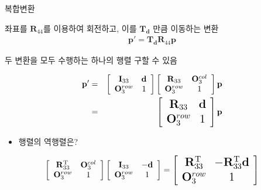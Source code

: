 \begin{frame}{복합변환}


좌표를 $\mathbf R_{44}$를 이용하여 회전하고, 이를 $\mathbf T_{\mathbf d}$ 만큼 이동하는 변환
\begin{eqnarray}
\mathbf p' = \mathbf T_{\mathbf d} \mathbf R_{44}  \mathbf p \nonumber
\end{eqnarray}

두 변환을 모두 수행하는 하나의 행렬 구할 수 있음 

\begin{eqnarray}
\mathbf p' & = &
\left [
\begin{array}{cc}
\mathbf I_{33} & \mathbf d \\
\mathbf O_3^{row} & 1
\end{array}
\right ]
\left [
\begin{array}{cc}
\mathbf R_{33} & \mathbf O_3^{col} \\
\mathbf O_3^{row} & 1
\end{array}
\right ]
\mathbf p \nonumber \\
& = &
\Large{
\left [
\begin{array}{cc}
\mathbf R_{33} & \mathbf d \\
\mathbf O_3^{row} & 1
\end{array}
\right ]
\mathbf p} \nonumber
\end{eqnarray}

\begin{itemize}
\item 행렬의 역행렬은?
\end{itemize}

\begin{eqnarray}
\left [
\begin{array}{cc}
\mathbf R_{33}^{\rm T} & \mathbf O_3^{col} \\
\mathbf O_3^{row} & 1
\end{array}
\right ]
\left [
\begin{array}{cc}
\mathbf I_{33} & - \mathbf d \\
\mathbf O_3^{row} & 1
\end{array}
\right ]
= 
\Large{
\left [
\begin{array}{cc}
\mathbf R_{33}^{\rm T} & - \mathbf R_{33}^{\rm T} \mathbf d \\
\mathbf O_3^{row} & 1
\end{array}
\right ]
} \nonumber
\end{eqnarray}

\end{frame}

